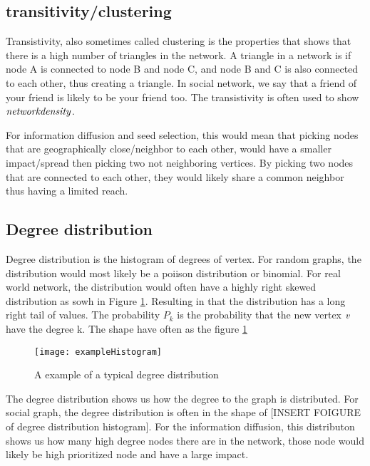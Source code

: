 \subsection{transitivity/clustering}
Transistivity, also sometimes called clustering is the properties that shows that there is a high number of triangles in the network. A triangle in a network is if node A is connected to node B and node C, and node B and C is also connected to each other, thus creating a triangle. In social network, we say that a friend of your friend is likely to be your friend too\cite{ComplexNetwork2003}. The transistivity is often used to show $\it{network density}$.

For information diffusion and seed selection, this would mean that picking nodes that are geographically close/neighbor to each other, would have a smaller impact/spread then picking two not neighboring vertices. By picking two nodes that are connected to each other, they would likely share a common neighbor thus having a limited reach.  

\subsection{Degree distribution}
Degree distribution is the histogram of degrees of vertex. For random graphs, the distribution would most likely be a poiison distribution or binomial. For real world network, the distribution would often have a highly right skewed distribution as sowh in Figure \ref{fig:exampleHistogram}. Resulting in that the distribution has a long right tail of values. The probability $P_k$ is the probability that the new vertex $\it{v}$ have the degree k. The shape have often as the figure \ref{fig:exampleHistogram}


\begin{figure}
	\texttt{[image: exampleHistogram]}
	\caption{A example of a typical degree distribution} 
	\label{fig:exampleHistogram}
\end{figure}

The degree distribution shows us how the degree to the graph is distributed. For social graph, the degree distribution is often in the shape of [INSERT FOIGURE of degree distribution histogram]. For the information diffusion, this distributon shows us how many high degree nodes there are in the network, those node would likely be high prioritized node and have a large impact. 

